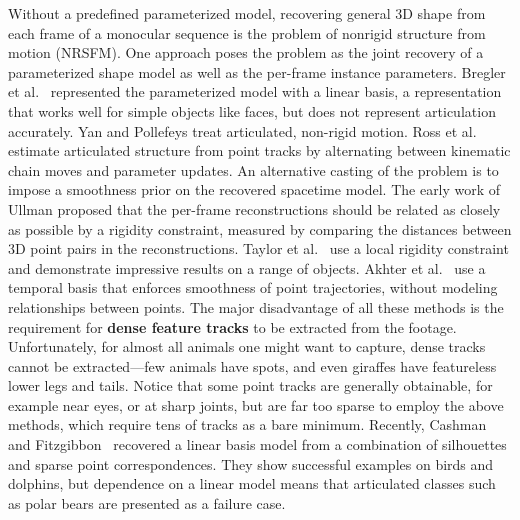 \documentclass[preprint]{acmsiggraph}
\begin{document}
Without a predefined parameterized model, recovering general 3D shape from each frame of a monocular sequence is the problem of nonrigid structure from motion (NRSFM).  One approach poses the problem as the joint recovery of a parameterized shape model as well as the per-frame instance parameters.  Bregler et al.~ represented the parameterized model with a linear basis, 
a representation that works well for simple objects like faces, but does not represent articulation accurately. 
Yan and Pollefeys  treat articulated, non-rigid motion.
Ross et al.~ estimate articulated structure from point tracks by alternating between kinematic chain moves and parameter updates.
An alternative casting of the problem is to impose a smoothness prior on the recovered spacetime model.  The early work of Ullman  proposed that the per-frame reconstructions should be related as closely as possible by a rigidity constraint, measured by comparing the distances between 3D point pairs in the reconstructions.  Taylor et al.~ use a local rigidity constraint and demonstrate impressive results on a range of objects. Akhter et al.~ use a temporal basis that enforces smoothness of point trajectories, without modeling relationships between points.
The major disadvantage of all these methods is the requirement for {\bf dense feature tracks} to be extracted from the footage.   Unfortunately, for almost all animals one might want to capture, dense tracks cannot be extracted---few animals have spots, and even giraffes have featureless lower legs and tails.   Notice that some point tracks are generally obtainable, for example near eyes, or at sharp joints, but are far too sparse to employ the above methods, which require tens of tracks as a bare minimum.  Recently, Cashman and Fitzgibbon~ recovered a linear basis model from a combination of silhouettes and sparse point correspondences.  They show successful examples on birds and dolphins, but dependence on a linear model means that articulated classes such as  polar bears are presented as a failure case.
\end{document}
